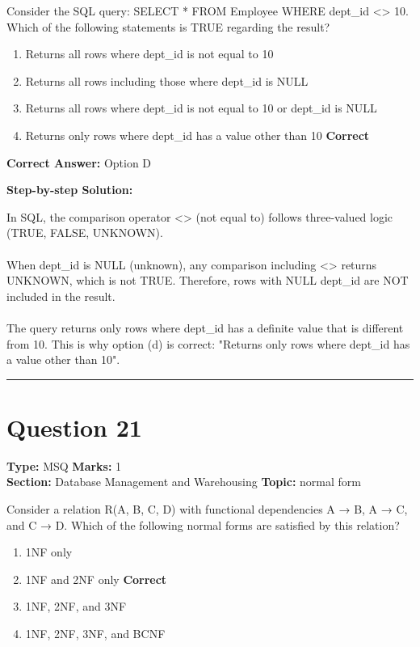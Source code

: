 \documentclass[11pt]{article}
\begin{document}
Consider the SQL query: SELECT * FROM Employee WHERE dept\_id <> 10. Which of the following statements is TRUE regarding the result?


\begin{enumerate}[label=\textbf{\Alph*.}, leftmargin=1.8em]
\item Returns all rows where dept\_id is not equal to 10\item Returns all rows including those where dept\_id is NULL\item Returns all rows where dept\_id is not equal to 10 or dept\_id is NULL\item Returns only rows where dept\_id has a value other than 10 \hfill {\color{gategreen}\textbf{Correct}}\end{enumerate}

\textbf{Correct Answer:} Option D

\textbf{Step-by-step Solution:}

In SQL, the comparison operator <> (not equal to) follows three-valued logic (TRUE, FALSE, UNKNOWN).\\
\\
When dept\_id is NULL (unknown), any comparison including <> returns UNKNOWN, which is not TRUE. Therefore, rows with NULL dept\_id are NOT included in the result.\\
\\
The query returns only rows where dept\_id has a definite value that is different from 10. This is why option (d) is correct: "Returns only rows where dept\_id has a value other than 10".

\vspace{0.8em}
\hrule
\vspace{0.4em}
\section*{Question 21}
\textbf{Type:} MSQ \hfill \textbf{Marks:} 1\\
\textbf{Section:} Database Management and Warehousing \hfill \textbf{Topic:} normal form

Consider a relation R(A, B, C, D) with functional dependencies A → B, A → C, and C → D. Which of the following normal forms are satisfied by this relation?


\begin{enumerate}[label=\textbf{\Alph*.}, leftmargin=1.8em]
\item 1NF only\item 1NF and 2NF only \hfill {\color{gategreen}\textbf{Correct}}\item 1NF, 2NF, and 3NF\item 1NF, 2NF, 3NF, and BCNF\end{enumerate}
\end{document}
